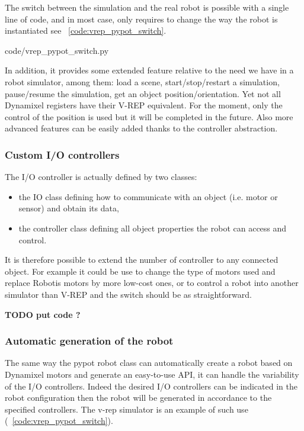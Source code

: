 The switch between the simulation and the real robot is possible with a single line of code, and in most case, only requires to change the way the robot is instantiated see \codename~\ref{code:vrep_pypot_switch}.


    {code/vrep_pypot_switch.py}

In addition, it provides some extended feature relative to the need we have in a robot simulator, among them:
load a scene, start/stop/restart a simulation, pause/resume the simulation, get an object position/orientation.
Yet not all Dynamixel registers have their V-REP equivalent. For the moment, only the control of the position is used but it will be completed in the future. Also more advanced features can be easily added thanks to the controller abstraction.


\subsubsection{Custom I/O controllers} %

The I/O controller is actually defined by two classes:

\begin{itemize}
    \item the IO class defining how to communicate with an object (i.e. motor or sensor) and obtain its data,
    \item the controller class defining all object properties the robot can access and control.
\end{itemize}

It is therefore possible to extend the number of controller to any connected object. For example it could be use to change the type of motors used and replace Robotis motors by more low-cost ones, or to control a robot into another simulator than V-REP and the switch should be as straightforward.


\textbf{TODO put code ?}


\subsubsection{Automatic generation of the robot} %
The same way the pypot robot class can automatically create a robot based on Dynamixel motors and generate an easy-to-use API, it can handle the variability of the I/O controllers. Indeed the desired I/O controllers can be indicated in the robot configuration then the robot will be generated in accordance to the specified controllers. The v-rep simulator is an example of such use (\codename~\ref{code:vrep_pypot_switch}).

